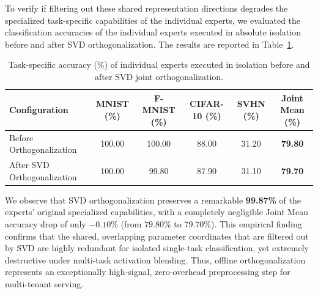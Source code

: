 \documentclass{article}
\theoremstyle{plain}
\theoremstyle{definition}
\theoremstyle{remark}
\begin{document}
To verify if filtering out these shared representation directions degrades the specialized task-specific capabilities of the individual experts, we evaluated the classification accuracies of the individual experts executed in absolute isolation before and after SVD orthogonalization. The results are reported in Table~\ref{tab:svd_retention}.

\begin{table}[H]
  \caption{Task-specific accuracy (\%) of individual experts executed in isolation before and after SVD joint orthogonalization.}
  \label{tab:svd_retention}
  \vskip 0.1in
  \begin{center}
  \begin{small}
  \begin{sc}
  \begin{tabular}{lccccc}
    \toprule
    Configuration & MNIST (\%) & F-MNIST (\%) & CIFAR-10 (\%) & SVHN (\%) & Joint Mean (\%) \\
    \midrule
    Before Orthogonalization & 100.00 & 100.00 & 88.00 & 31.20 & \textbf{79.80} \\
    After SVD Orthogonalization & 100.00 & 99.80 & 87.90 & 31.10 & \textbf{79.70} \\
    \bottomrule
  \end{tabular}
  \end{sc}
  \end{small}
  \end{center}
\end{table}

We observe that SVD orthogonalization preserves a remarkable \textbf{99.87\%} of the experts' original specialized capabilities, with a completely negligible Joint Mean accuracy drop of only $-0.10\%$ (from $79.80\%$ to $79.70\%$). This empirical finding confirms that the shared, overlapping parameter coordinates that are filtered out by SVD are highly redundant for isolated single-task classification, yet extremely destructive under multi-task activation blending. Thus, offline orthogonalization represents an exceptionally high-signal, zero-overhead preprocessing step for multi-tenant serving.
\end{document}
